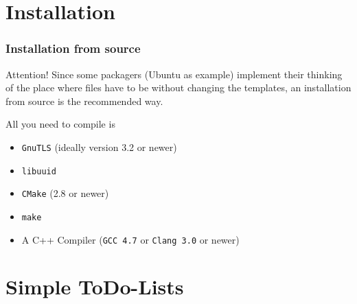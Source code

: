 \documentclass[t,handout]{beamer}
\begin{document}
\section{Installation}

\begin{frame}[fragile]\frametitle{Installation from source}

    \begin{alertblock}{Attention!}
    Since some packagers (Ubuntu as example) implement their thinking of the place where files have to be without changing the templates, an installation from source is the recommended way.
    \end{alertblock}
    \pause

    All you need to compile is
    \begin{itemize}
        \item \verb+GnuTLS+ (ideally version 3.2 or newer)
        \item \verb+libuuid+
        \item \verb+CMake+ (2.8 or newer)
        \item \verb+make+
        \item A C++ Compiler (\verb+GCC 4.7+ or \verb+Clang 3.0+ or newer)
    \end{itemize}

\end{frame}



\section{Simple ToDo-Lists}
\end{document}
